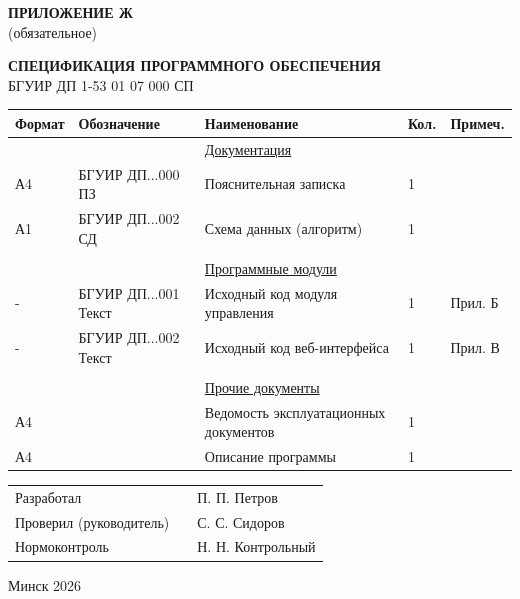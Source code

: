 \newpage
\begin{flushright}
    {\bfseries ПРИЛОЖЕНИЕ Ж} \\
    (обязательное)
\end{flushright}

\begin{center}
    {\bfseries СПЕЦИФИКАЦИЯ ПРОГРАММНОГО ОБЕСПЕЧЕНИЯ} \\
    \vspace{0.2cm}
    БГУИР ДП 1-53 01 07 000 СП
\end{center}


\vspace{0.5cm}

\begin{center}
\begin{tabular}{|p{1.5cm}|p{3.5cm}|p{7.5cm}|p{1.5cm}|p{1.5cm}|}
\hline
\centering \textbf{Формат} & \centering \textbf{Обозначение} & \centering \textbf{Наименование} & \centering \textbf{Кол.} & \textbf{Примеч.} \\ \hline
& & \underline{Документация} & & \\ \hline
А4 & БГУИР ДП...000 ПЗ & Пояснительная записка & 1 & \\ \hline
А1 & БГУИР ДП...002 СД & Схема данных (алгоритм) & 1 & \\ \hline
& & & & \\ \hline
& & \underline{Программные модули} & & \\ \hline
- & БГУИР ДП...001 Текст & Исходный код модуля управления & 1 & Прил. Б \\ \hline
- & БГУИР ДП...002 Текст & Исходный код веб-интерфейса & 1 & Прил. В \\ \hline
& & & & \\ \hline
& & \underline{Прочие документы} & & \\ \hline
А4 & & Ведомость эксплуатационных документов & 1 & \\ \hline
А4 & & Описание программы & 1 & \\ \hline
\end{tabular}
\end{center}

\vspace{1cm}

\begin{flushleft}
    \begin{tabular}{p{6cm} p{4cm} l}
        Разработал & \underline{\hspace{3cm}} & П. П. Петров \\
        Проверил (руководитель) & \underline{\hspace{3cm}} & С. С. Сидоров \\
        Нормоконтроль & \underline{\hspace{3cm}} & Н. Н. Контрольный
    \end{tabular}
\end{flushleft}

\vfill
\begin{center}
    Минск 2026
\end{center}

\newpage